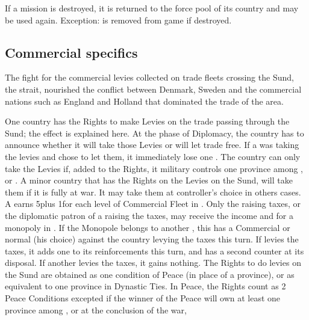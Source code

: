 \aparag If a mission is destroyed, it is returned to the force pool of its
country and may be used again.
\bparag Exception:  is removed from game if destroyed.

\subsection{Commercial specifics}
\label{chSpecific:Sund Levies}
\begin{designnote}
  The fight for the commercial levies collected on trade fleets crossing the
  Sund, the  strait, nourished the conflict between Denmark,
  Sweden and the commercial nations such as England and Holland that dominated
  the trade of the area.
\end{designnote}
\aparag One country has the Rights to make Levies on the trade passing through
the Sund; the effect is explained here.
\bparag At the phase of Diplomacy, the country has to announce whether it will
take those Levies or will let trade free.
\bparag If a \MAJ was taking the levies and chose to let them, it immediately
lose one \STAB.
\bparag The country can only take the Levies if, added to the Rights, it
military controls one province among ,
 or .
\bparag A minor country that has the Rights on the Levies on the Sund, will
take them if it is fully at war. It may take them at controller's choice in
others cases.
\bparag A \MAJ earns 5\ducats plus 1\ducats for each level of Commercial Fleet
in .
\bparag Only the \MAJ raising taxes, or the diplomatic patron of a \MIN
raising the taxes, may receive the income and \PV for a monopoly in
. If the Monopole belongs to another \MAJ, this \MAJ has a
Commercial or normal \CB (his choice) against the country levying the taxes
this turn.
\bparag If  levies the taxes, it adds one \LD to its
reinforcements this turn, and has a second \ARMY counter at its disposal.
\bparag If another \MIN levies the taxes, it gains nothing.
\bparag The Rights to do levies on the Sund are obtained as one condition of
Peace (in place of a province), or as equivalent to one province in Dynastic
Ties.
\bparag In Peace, the Rights count as 2 Peace Conditions excepted if the
winner of the Peace will own at least one province among ,
 or  at the conclusion of the war,
